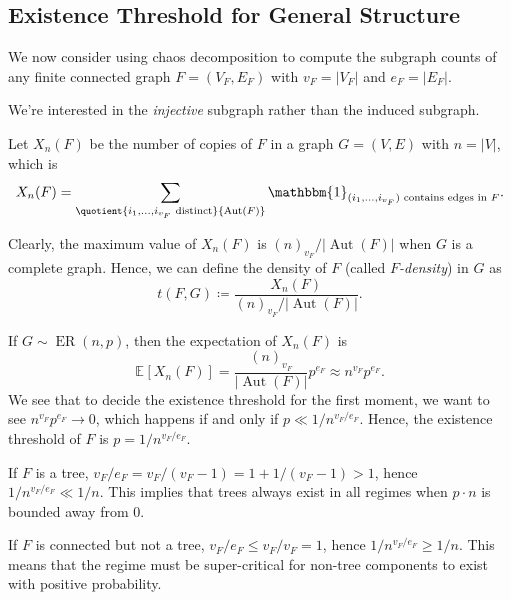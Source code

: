 \subsection{Existence Threshold for General Structure}
We now consider using chaos decomposition to compute the subgraph counts of any finite connected graph \(F = (V_F, E_F)\) with \(v_F = \lvert V_F \rvert \) and \(e_F = \lvert E_F \rvert\).

\begin{note}
	We're interested in the \emph{injective} subgraph rather than the induced subgraph.
\end{note}

Let \(X_n(F)\) be the number of copies of \(F\) in a graph \(G = (V, E)\) with \(n = \lvert V \rvert \), which is
\[
	X_n(F)
	= \sum_{\quotient{i_1, \dots , i_{v_F} \text{ distinct}}{\operatorname{Aut}(F)}} \mathbbm{1}_{(i_1, \dots , i_{v_F})\text{ contains edges in } F}.
\]
\begin{remark}[\(F\)-density]
	Clearly, the maximum value of \(X_n(F)\) is \((n)_{v_F} / \lvert \operatorname{Aut}(F)  \rvert \) when \(G\) is a complete graph. Hence, we can define the density of \(F\) (called \emph{\(F\)-density}) in \(G\) as
	\[
		t(F, G)
		\coloneqq \frac{X_n(F)}{(n)_{v_F} / \lvert \operatorname{Aut}(F)  \rvert }.
	\]
\end{remark}

If \(G \sim \operatorname{ER}(n, p) \), then the expectation of \(X_n(F)\) is
\[
	\mathbb{E}_{}[X_n(F)]
	= \frac{(n)_{v_F}}{\lvert \operatorname{Aut}(F)  \rvert } p^{e_F}
	\approx n^{v_F} p^{e_F}.
\]
We see that to decide the existence threshold for the first moment, we want to see \(n^{v_F} p^{e_F} \to 0\), which happens if and only if \(p \ll 1 / n^{v_F / e_F}\). Hence, the existence threshold of \(F\) is \(p = 1 / n^{v_F / e_F}\).

\begin{eg}
	If \(F\) is a tree, \(v_F / e_F = v_F / (v_F - 1) = 1 + 1 / (v_F - 1) > 1\), hence \(1 / n^{v_F / e_F} \ll 1 / n\). This implies that trees always exist in all regimes when \(p \cdot n\) is bounded away from \(0\).
\end{eg}

\begin{eg}
	If \(F\) is connected but not a tree, \(v_F / e_F \leq v_F / v_F = 1\), hence \(1 / n^{v_F / e_F} \geq 1 / n\). This means that the regime must be super-critical for non-tree components to exist with positive probability.
\end{eg}

